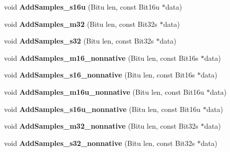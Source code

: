 \begin{DoxyCompactItemize}
\item 
\hypertarget{classMixerChannel_aea2887c8acf1c257aebac084292ddfbd}{void {\bfseries Add\-Samples\-\_\-s16u} (Bitu len, const Bit16u $\ast$data)}\label{classMixerChannel_aea2887c8acf1c257aebac084292ddfbd}

\item 
\hypertarget{classMixerChannel_a8f6f70528e13e637403e8fc368867c97}{void {\bfseries Add\-Samples\-\_\-m32} (Bitu len, const Bit32s $\ast$data)}\label{classMixerChannel_a8f6f70528e13e637403e8fc368867c97}

\item 
\hypertarget{classMixerChannel_a2eec58265bd8e3f3996468a73e80e19f}{void {\bfseries Add\-Samples\-\_\-s32} (Bitu len, const Bit32s $\ast$data)}\label{classMixerChannel_a2eec58265bd8e3f3996468a73e80e19f}

\item 
\hypertarget{classMixerChannel_a10a0164e8e238c967190e9536c2b71cc}{void {\bfseries Add\-Samples\-\_\-m16\-\_\-nonnative} (Bitu len, const Bit16s $\ast$data)}\label{classMixerChannel_a10a0164e8e238c967190e9536c2b71cc}

\item 
\hypertarget{classMixerChannel_a1ce7497712bc86d40a16865993636bd8}{void {\bfseries Add\-Samples\-\_\-s16\-\_\-nonnative} (Bitu len, const Bit16s $\ast$data)}\label{classMixerChannel_a1ce7497712bc86d40a16865993636bd8}

\item 
\hypertarget{classMixerChannel_ab7074c96bd7c25d9ca33509c944faa61}{void {\bfseries Add\-Samples\-\_\-m16u\-\_\-nonnative} (Bitu len, const Bit16u $\ast$data)}\label{classMixerChannel_ab7074c96bd7c25d9ca33509c944faa61}

\item 
\hypertarget{classMixerChannel_ab638e9ff862c19e43b82218879854cb0}{void {\bfseries Add\-Samples\-\_\-s16u\-\_\-nonnative} (Bitu len, const Bit16u $\ast$data)}\label{classMixerChannel_ab638e9ff862c19e43b82218879854cb0}

\item 
\hypertarget{classMixerChannel_ab590ebd5d99f20882b4e013932f46284}{void {\bfseries Add\-Samples\-\_\-m32\-\_\-nonnative} (Bitu len, const Bit32s $\ast$data)}\label{classMixerChannel_ab590ebd5d99f20882b4e013932f46284}

\item 
\hypertarget{classMixerChannel_a9283464a784a81c0548c45d9c5375b32}{void {\bfseries Add\-Samples\-\_\-s32\-\_\-nonnative} (Bitu len, const Bit32s $\ast$data)}\label{classMixerChannel_a9283464a784a81c0548c45d9c5375b32}


\end{DoxyCompactItemize}
